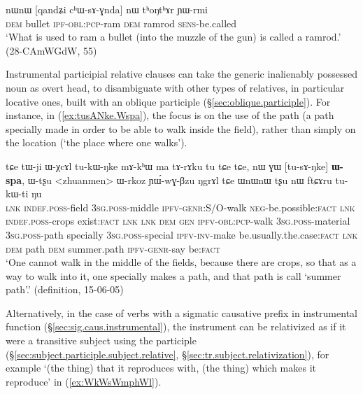 \begin{exe}
\ex \label{ex:qandZi.chWsAGnda}
\gll nɯnɯ [qandʑi cʰɯ-sɤ-ɣnda] nɯ tʰoŋtʰɤr ɲɯ-rmi \\
\textsc{dem} bullet \textsc{ipf}-\textsc{obl}:\textsc{pcp}-ram \textsc{dem} ramrod \textsc{sens}-be.called \\
 \glt `What is used to ram a bullet (into the muzzle of the gun) is called a ramrod.' (28-CAmWGdW, 55)
\end{exe} 
 
 Instrumental participial relative clauses can take the generic inalienably possessed noun  as overt head, to disambiguate with other types of relatives, in particular locative ones, built with an oblique participle (§\ref{sec:oblique.participle}). For instance, in (\ref{ex:tusANke.Wspa}), the focus is on the use of the path (a path specially made in order to be able to walk inside the field), rather than simply on the location (`the place where one walks').

\begin{exe}
\ex \label{ex:tusANke.Wspa}
\gll tɕe tɯ-ji ɯ-χcɤl tu-kɯ-ŋke mɤ-kʰɯ ma tɤ-rɤku tu tɕe tɕe, nɯ ɣɯ [tu-sɤ-ŋke] \textbf{ɯ-spa}, ɯ-tʂu <zhuanmen> ɯ-rkoz ɲɯ́-wɣ-βzu ŋgrɤl tɕe ɯnɯnɯ tʂu nɯ ftɕɤru tu-kɯ-ti ŋu \\
\textsc{lnk} \textsc{indef}.\textsc{poss}-field \textsc{3sg}.\textsc{poss}-middle \textsc{ipfv}-\textsc{genr}:S/O-walk \textsc{neg}-be.possible:\textsc{fact} \textsc{lnk} \textsc{indef}.\textsc{poss}-crops exist:\textsc{fact} \textsc{lnk} \textsc{lnk} \textsc{dem} \textsc{gen} \textsc{ipfv}-\textsc{obl}:\textsc{pcp}-walk \textsc{3sg}.\textsc{poss}-material \textsc{3sg}.\textsc{poss}-path specially \textsc{3sg}.\textsc{poss}-special \textsc{ipfv}-\textsc{inv}-make be.usually.the.case:\textsc{fact} \textsc{lnk} \textsc{dem} path \textsc{dem} summer.path \textsc{ipfv}-\textsc{genr}-say be:\textsc{fact} \\
\glt `One cannot walk in the middle of the fields, because there are crops, so that as a way to walk into it, one specially makes a path, and that path is call `summer path'.' (definition, 15-06-05)
\end{exe} 

Alternatively, in the case of verbs with a sigmatic causative prefix in instrumental function (§\ref{sec:sig.caus.instrumental}), the instrument can be relativized as if it were a transitive subject using the  participle (§\ref{sec:subject.participle.subject.relative}, §\ref{sec:tr.subject.relativization}), for example  `(the thing) that it reproduces with, (the thing) which makes it reproduce' in (\ref{ex:WkWsWmphWl}).

